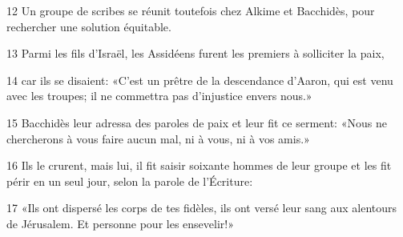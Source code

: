
12 Un groupe de scribes se réunit toutefois chez Alkime et Bacchidès, pour rechercher une solution équitable.

13 Parmi les fils d’Israël, les Assidéens furent les premiers à solliciter la paix,

14 car ils se disaient: «C’est un prêtre de la descendance d’Aaron, qui est venu avec les troupes; il ne commettra pas d’injustice envers nous.»

15 Bacchidès leur adressa des paroles de paix et leur fit ce serment: «Nous ne chercherons à vous faire aucun mal, ni à vous, ni à vos amis.»

16 Ils le crurent, mais lui, il fit saisir soixante hommes de leur groupe et les fit périr en un seul jour, selon la parole de l’Écriture:

17 «Ils ont dispersé les corps de tes fidèles, ils ont versé leur sang aux alentours de Jérusalem. Et personne pour les ensevelir!»